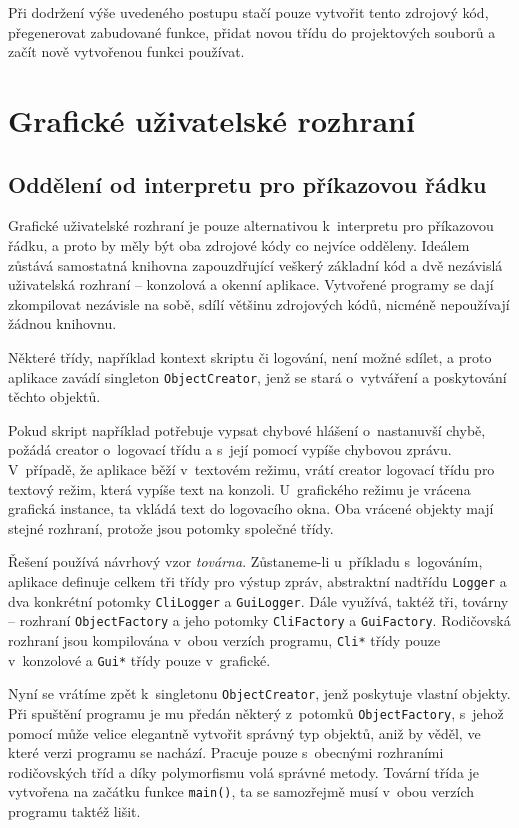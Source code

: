 \documentclass[11pt,twoside,a4paper]{book}
\begin{document}
Při dodržení výše uvedeného postupu stačí pouze vytvořit tento zdrojový kód, přegenerovat zabudované funkce, přidat novou třídu do projektových souborů a začít nově vytvořenou funkci používat.


\section{Grafické uživatelské rozhraní}

\subsection{Oddělení od interpretu pro příkazovou řádku}
\label{oddeleni_od_interpretu_pro_prikazovou_radku}

Grafické uživatelské rozhraní je pouze alternativou k~interpretu pro příkazovou řádku, a proto by měly být oba zdrojové kódy co nejvíce odděleny. Ideálem zůstává samostatná knihovna zapouzdřující veškerý základní kód a dvě nezávislá uživatelská rozhraní -- konzolová a okenní aplikace. Vytvořené programy se dají zkompilovat nezávisle na sobě, sdílí většinu zdrojových kódů, nicméně nepoužívají žádnou knihovnu.

Některé třídy, například kontext skriptu či logování, není možné sdílet, a proto aplikace zavádí singleton \texttt{ObjectCreator}, jenž se stará o~vytváření a poskytování těchto objektů.

Pokud skript například potřebuje vypsat chybové hlášení o~nastanuvší chybě, požádá creator o~logovací třídu a s~její pomocí vypíše chybovou zprávu. V~případě, že aplikace běží v~textovém režimu, vrátí creator logovací třídu pro textový režim, která vypíše text na konzoli. U~grafického režimu je vrácena grafická instance, ta vkládá text do logovacího okna. Oba vrácené objekty mají stejné rozhraní, protože jsou potomky společné třídy.

Řešení používá návrhový vzor \textit{továrna}. Zůstaneme-li u~příkladu s~logováním, aplikace definuje celkem tři třídy pro výstup zpráv, abstraktní nadtřídu \texttt{Logger} a dva konkrétní potomky \texttt{CliLogger} a \texttt{GuiLogger}. Dále využívá, taktéž tři, továrny -- rozhraní \texttt{ObjectFactory} a jeho potomky \texttt{CliFactory} a \texttt{GuiFactory}. Rodičovská rozhraní jsou kompilována v~obou verzích programu, \texttt{Cli*} třídy pouze v~konzolové a \texttt{Gui*} třídy pouze v~grafické.

Nyní se vrátíme zpět k~singletonu \texttt{ObjectCreator}, jenž poskytuje vlastní objekty. Při spuštění programu je mu předán některý z~potomků \texttt{ObjectFactory}, s~jehož pomocí může velice elegantně vytvořit správný typ objektů, aniž by věděl, ve které verzi programu se nachází. Pracuje pouze s~obecnými rozhraními rodičovských tříd a díky polymorfismu volá správné metody. Tovární třída je vytvořena na začátku funkce \texttt{main()}, ta se samozřejmě musí v~obou verzích programu taktéž lišit.
\end{document}
